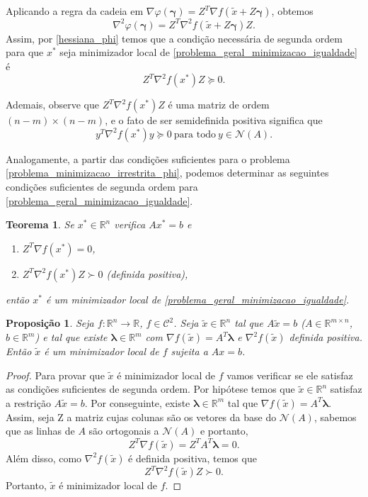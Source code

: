 \documentclass[12pt,a4paper]{scrartcl}
\def\RR{\mathds{R}}
\newtheorem{prop}{Proposição}
\newtheorem{teo}{Teorema}
\theoremstyle{definition}%
\begin{document}
Aplicando a regra da cadeia em $\nabla \varphi(\boldsymbol{\gamma}) = Z^{T}\nabla f(\tilde{x} + Z\boldsymbol{\gamma})$, obtemos
\[
\nabla^{2} \varphi(\boldsymbol{\gamma}) = Z^{T} \nabla^{2} f(\tilde{x} + Z\boldsymbol{\gamma})Z .
\]
Assim, por \eqref{hessiana_phi} temos que a condição necessária de segunda ordem para que $x^{*}$ seja minimizador local de \eqref{problema_geral_minimizacao_igualdade} é
\[
Z^{T} \nabla^{2} f(x^{*})Z \succcurlyeq 0.
\]

Ademais, observe que $Z^{T}\nabla^{2} f(x^{*})Z$ é uma matriz de ordem $(n-m)\times (n-m)$, e o fato de ser semidefinida positiva significa que
\[
y^{T}\nabla^{2} f(x^{*})y \succcurlyeq 0 \ \text{para todo} \ y \in \mathcal{N}(A) .
\]

Analogamente, a partir das condições suficientes para o problema \eqref{problema_minimizacao_irrestrita_phi}, podemos determinar as seguintes condições suficientes de segunda ordem para \eqref{problema_geral_minimizacao_igualdade}.

\begin{teo} \label{teo:condicao_suficiente_2ordem_igualdade}
Se $x^{*} \in \RR^{n}$ verifica $Ax^{*}=b$ e 
\begin{enumerate}
	\item[(i)] $Z^{T}\nabla f(x^{*}) =0$,
	\item[(ii)] $Z^{T}\nabla^{2} f(x^{*})Z \succ 0$ (definida positiva),
\end{enumerate}	
então $x^{*}$ é um minimizador local de \eqref{problema_geral_minimizacao_igualdade}.
\end{teo}

\begin{prop}
Seja $f: \RR^{n} \rightarrow \RR$, $f \in \mathcal{C}^{2}$. Seja $\tilde{x} \in \RR^{n}$ tal que $A\tilde{x} = b$ ($A\in \RR^{m\times n}$, $b\in \RR^{m}$) e tal que existe $\boldsymbol{\lambda} \in \RR^{m}$ com $\nabla f(\tilde{x}) = A^{T}\boldsymbol{\lambda}$ e $\nabla^{2} f(\tilde{x})$ definida positiva. Então $\tilde{x}$ é um minimizador local de $f$ sujeita a $Ax=b$.
\end{prop}
\begin{proof}
Para provar que $\tilde{x}$ é minimizador local de $f$ vamos verificar se ele satisfaz as condições suficientes de segunda ordem. Por hipótese temos que $\tilde{x} \in \RR^{n}$ satisfaz a restrição $A\tilde{x} = b$. Por conseguinte, existe $\boldsymbol{\lambda} \in \RR^{m}$ tal que $\nabla f(\tilde{x}) = A^{T}\boldsymbol{\lambda}$. Assim, seja Z a matriz cujas colunas são os vetores da base do $\mathcal{N}(A)$, sabemos que as linhas de $A$ são ortogonais a $\mathcal{N}(A)$ e portanto,
\[
Z^{T}\nabla f(\tilde{x}) = Z^{T}A^{T}\boldsymbol{\lambda} = 0.
\]
Além disso, como $\nabla^{2} f(\tilde{x})$ é definida positiva, temos que 
\[
Z^{T}\nabla^{2} f(\tilde{x}) Z \succ 0.
\]
Portanto, $\tilde{x}$ é minimizador local de $f$.
\end{proof}
\end{document}
